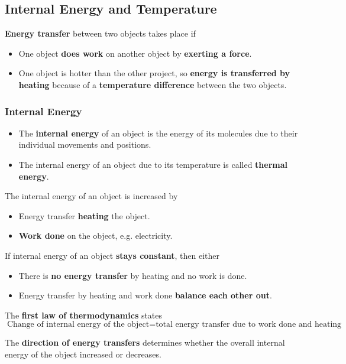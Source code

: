 \subsection{Internal Energy and Temperature}

\textbf{Energy transfer} between two objects takes place if
\begin{itemize}
    \item One object \textbf{does work} on another object by \textbf{exerting a force}.
    \item One object is hotter than the other project, so \textbf{energy is transferred by heating} because of a \textbf{temperature difference} between the two objects.
\end{itemize}

\subsubsection*{Internal Energy}

\begin{itemize}
    \item The \textbf{internal energy} of an object is the energy of its molecules due to their individual movements and positions.
    \item The internal energy of an object due to its temperature is called \textbf{thermal energy}.
\end{itemize}

The internal energy of an object is increased by
\begin{itemize}
    \item Energy transfer \textbf{heating} the object.
    \item \textbf{Work done} on the object, e.g. electricity.
\end{itemize}

If internal energy of an object \textbf{stays constant}, then either
\begin{itemize}
    \item There is \textbf{no energy transfer} by heating and no work is done.
    \item Energy transfer by heating and work done \textbf{balance each other out}.
\end{itemize}

The \textbf{first law of thermodynamics} states
$$\text{Change of internal energy of the object}=\text{total energy transfer due to work done and heating}$$

The \textbf{direction of energy transfers} determines whether the overall internal energy of the object increased or decreases.

